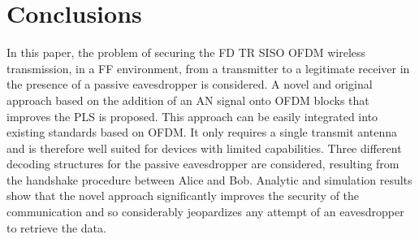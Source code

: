 \documentclass[journal,comsoc]{IEEEtran}
\let\MYoriglatexcaption\caption
\renewcommand{\caption}[2][\relax]{\MYoriglatexcaption[#2]{#2}}
\begin{document}
\section{Conclusions}\label{sec:conclusions}
In this paper, the problem of securing the FD TR SISO OFDM wireless transmission, in a FF environment, from a transmitter to a legitimate receiver in the presence of a passive eavesdropper is considered. A novel and original approach based on the addition of an AN signal onto OFDM blocks that improves the PLS is proposed. This approach can be easily integrated into existing standards based on OFDM. It only requires a single transmit antenna and is therefore well suited for devices with limited capabilities. Three different decoding structures for the passive eavesdropper are considered, resulting from the handshake procedure between Alice and Bob. Analytic and simulation results show that the novel approach significantly improves the security of the communication and so considerably jeopardizes any attempt of an eavesdropper to retrieve the data.





















\ifCLASSOPTIONcaptionsoff
  \newpage
\fi



 





\end{document}
